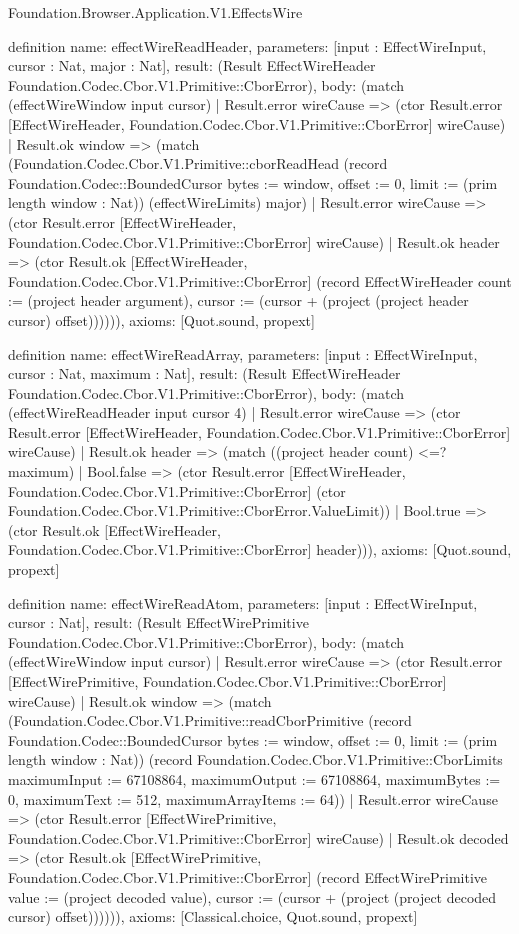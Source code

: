\begin{lexlean}{Foundation.Browser.Application.V1.EffectsWire}
\begin{semanticmodule}
definition{
  name: effectWireReadHeader,
  parameters: [input : EffectWireInput, cursor : Nat, major : Nat],
  result: (Result EffectWireHeader Foundation.Codec.Cbor.V1.Primitive::CborError),
  body: (match (effectWireWindow input cursor)
    | Result.error wireCause => (ctor Result.error [EffectWireHeader, Foundation.Codec.Cbor.V1.Primitive::CborError] wireCause)
    | Result.ok window => (match (Foundation.Codec.Cbor.V1.Primitive::cborReadHead (record Foundation.Codec::BoundedCursor {bytes := window, offset := 0, limit := (prim length window : Nat)}) (effectWireLimits) major)
      | Result.error wireCause => (ctor Result.error [EffectWireHeader, Foundation.Codec.Cbor.V1.Primitive::CborError] wireCause)
      | Result.ok header => (ctor Result.ok [EffectWireHeader, Foundation.Codec.Cbor.V1.Primitive::CborError] (record EffectWireHeader {count := (project header argument), cursor := (cursor + (project (project header cursor) offset))})))),
  axioms: [Quot.sound, propext]
}

definition{
  name: effectWireReadArray,
  parameters: [input : EffectWireInput, cursor : Nat, maximum : Nat],
  result: (Result EffectWireHeader Foundation.Codec.Cbor.V1.Primitive::CborError),
  body: (match (effectWireReadHeader input cursor 4)
    | Result.error wireCause => (ctor Result.error [EffectWireHeader, Foundation.Codec.Cbor.V1.Primitive::CborError] wireCause)
    | Result.ok header => (match ((project header count) <=? maximum)
      | Bool.false => (ctor Result.error [EffectWireHeader, Foundation.Codec.Cbor.V1.Primitive::CborError] (ctor Foundation.Codec.Cbor.V1.Primitive::CborError.ValueLimit))
      | Bool.true => (ctor Result.ok [EffectWireHeader, Foundation.Codec.Cbor.V1.Primitive::CborError] header))),
  axioms: [Quot.sound, propext]
}

definition{
  name: effectWireReadAtom,
  parameters: [input : EffectWireInput, cursor : Nat],
  result: (Result EffectWirePrimitive Foundation.Codec.Cbor.V1.Primitive::CborError),
  body: (match (effectWireWindow input cursor)
    | Result.error wireCause => (ctor Result.error [EffectWirePrimitive, Foundation.Codec.Cbor.V1.Primitive::CborError] wireCause)
    | Result.ok window => (match (Foundation.Codec.Cbor.V1.Primitive::readCborPrimitive (record Foundation.Codec::BoundedCursor {bytes := window, offset := 0, limit := (prim length window : Nat)}) (record Foundation.Codec.Cbor.V1.Primitive::CborLimits {maximumInput := 67108864, maximumOutput := 67108864, maximumBytes := 0, maximumText := 512, maximumArrayItems := 64}))
      | Result.error wireCause => (ctor Result.error [EffectWirePrimitive, Foundation.Codec.Cbor.V1.Primitive::CborError] wireCause)
      | Result.ok decoded => (ctor Result.ok [EffectWirePrimitive, Foundation.Codec.Cbor.V1.Primitive::CborError] (record EffectWirePrimitive {value := (project decoded value), cursor := (cursor + (project (project decoded cursor) offset))})))),
  axioms: [Classical.choice, Quot.sound, propext]
}


\end{semanticmodule}
\end{lexlean}
